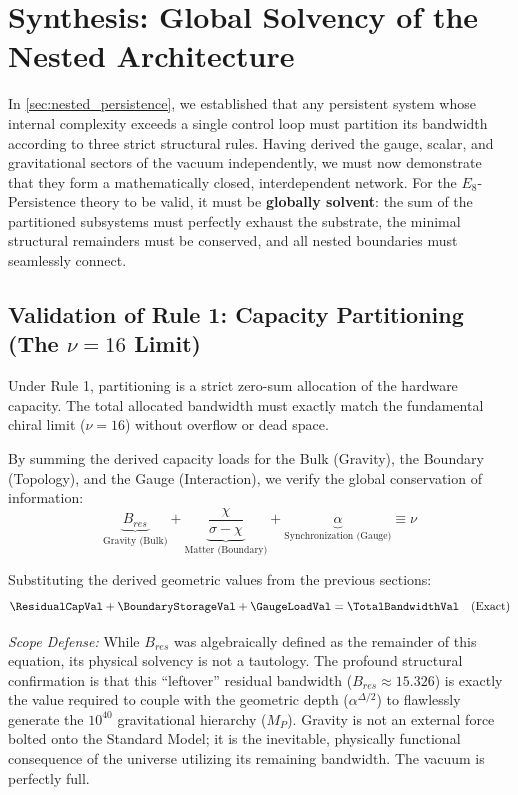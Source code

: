 
\section{Synthesis: Global Solvency of the Nested Architecture}
\label{sec:Synthesis}

In \cref{sec:nested_persistence}, we established that any persistent system whose internal complexity exceeds a single control loop must partition its bandwidth according to three strict structural rules. Having derived the gauge, scalar, and gravitational sectors of the vacuum independently, we must now demonstrate that they form a mathematically closed, interdependent network. For the $E_8$-Persistence theory to be valid, it must be \textbf{globally solvent}: the sum of the partitioned subsystems must perfectly exhaust the substrate, the minimal structural remainders must be conserved, and all nested boundaries must seamlessly connect.

\subsection{Validation of Rule 1: Capacity Partitioning (The \texorpdfstring{$\nu=16$}{nu=16} Limit)}
Under Rule 1, partitioning is a strict zero-sum allocation of the hardware capacity. The total allocated bandwidth must exactly match the fundamental chiral limit ($\nu = 16$) without overflow or dead space. 

By summing the derived capacity loads for the Bulk (Gravity), the Boundary (Topology), and the Gauge (Interaction), we verify the global conservation of information:
\begin{equation}
\underbrace{B_{res}}_{\text{Gravity (Bulk)}} + \underbrace{\frac{\chi}{\sigma-\chi}}_{\text{Matter (Boundary)}} + \underbrace{\alpha}_{\text{Synchronization (Gauge)}} \equiv \nu
\end{equation}

Substituting the derived geometric values from the previous sections:
\begin{equation}
\ResidualCapVal + \BoundaryStorageVal + \GaugeLoadVal = \TotalBandwidthVal \quad (\text{Exact})
\end{equation}

\textit{Scope Defense:} While $B_{res}$ was algebraically defined as the remainder of this equation, its physical solvency is not a tautology. The profound structural confirmation is that this ``leftover'' residual bandwidth ($B_{res} \approx 15.326$) is exactly the value required to couple with the geometric depth ($\alpha^{\Delta/2}$) to flawlessly generate the $10^{40}$ gravitational hierarchy ($M_P$). Gravity is not an external force bolted onto the Standard Model; it is the inevitable, physically functional consequence of the universe utilizing its remaining bandwidth. The vacuum is perfectly full.

